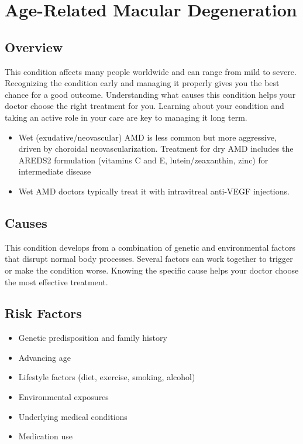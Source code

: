 \chapter{Age-Related Macular Degeneration}
\label{sec:geriatric:Age-Related Macular Degeneration}

\section{Overview}
This condition affects many people worldwide and can range from mild to severe. Recognizing the condition early and managing it properly gives you the best chance for a good outcome. Understanding what causes this condition helps your doctor choose the right treatment for you. Learning about your condition and taking an active role in your care are key to managing it long term.

\begin{itemize}[noitemsep]
  \item Wet (exudative/neovascular) AMD is less common but more aggressive, driven by choroidal neovascularization. Treatment for dry AMD includes the AREDS2 formulation (vitamins C and E, lutein/zeaxanthin, zinc) for intermediate disease
  \item Wet AMD doctors typically treat it with intravitreal anti-VEGF injections.
\end{itemize}

\section{Causes}
This condition develops from a combination of genetic and environmental factors that disrupt normal body processes. Several factors can work together to trigger or make the condition worse. Knowing the specific cause helps your doctor choose the most effective treatment.

\section{Risk Factors}

\begin{itemize}[noitemsep]
  \item Genetic predisposition and family history
  \item Advancing age
  \item Lifestyle factors (diet, exercise, smoking, alcohol)
  \item Environmental exposures
  \item Underlying medical conditions
  \item Medication use
\end{itemize}

